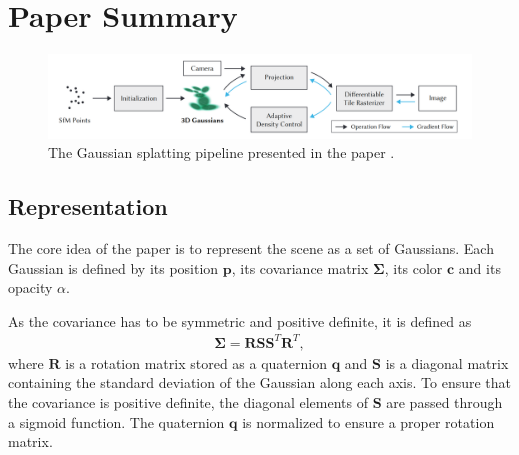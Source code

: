 

\section{Paper Summary}

\begin{figure}
    \centering
    \includegraphics[width=\textwidth]{images/pipeline.png}
    \caption{The Gaussian splatting pipeline presented in the paper \cite[Fig. 2]{kerbl3DGaussianSplatting2023}.}
\end{figure}


\subsection{Representation}
The core idea of the paper is to represent the scene as a set of Gaussians.
Each Gaussian is defined by its position $\bm{p}$, its covariance matrix $\bm{\Sigma}$, its color $\bm{c}$ and its opacity $\alpha$.

As the covariance has to be symmetric and positive definite, it is defined as
\begin{align}
    \bm{\Sigma} = \bm{R} \bm{S} \bm{S}^T \bm{R}^T,
\end{align}
where $\bm{R}$ is a rotation matrix stored as a quaternion $\bm{q}$ and $\bm{S}$ is a diagonal matrix containing the standard deviation of the Gaussian along each axis.
To ensure that the covariance is positive definite, the diagonal elements of $\bm{S}$ are passed through a sigmoid function.
The quaternion $\bm{q}$ is normalized to ensure a proper rotation matrix.



